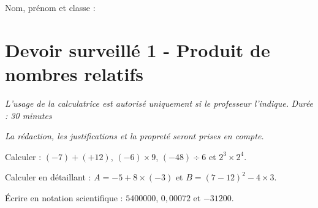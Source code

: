 \documentclass[a4paper,10pt]{report}
\begin{document}
\pagestyle{empty}
\noindent Nom, prénom et classe : \dotfill

\section*{Devoir surveillé 1 - Produit de nombres relatifs}

\noindent \textit{L'usage de la calculatrice est autorisé uniquement si le professeur l'indique.} \hfill \textit{Durée : 30 minutes}

\medskip
\noindent \textit{La rédaction, les justifications et la propreté seront prises en compte.}


\begin{ex}[Calculs]
Calculer : $(-7)+(+12)$, $(-6)\times 9$, $(-48)\div 6$ et $2^3\times2^4$.
\medskip\noindent\grandscarreaux{\linewidth}{4cm}
\end{ex}
\begin{ex}[Priorités]
Calculer en détaillant : $A=-5+8\times(-3)$ et $B=(7-12)^2-4\times3$.
\medskip\noindent\grandscarreaux{\linewidth}{4cm}
\end{ex}
\begin{ex}
Écrire en notation scientifique : $5400000$, $0,00072$ et $-31200$.
\medskip\noindent\grandscarreaux{\linewidth}{3cm}
\end{ex}
\end{document}
